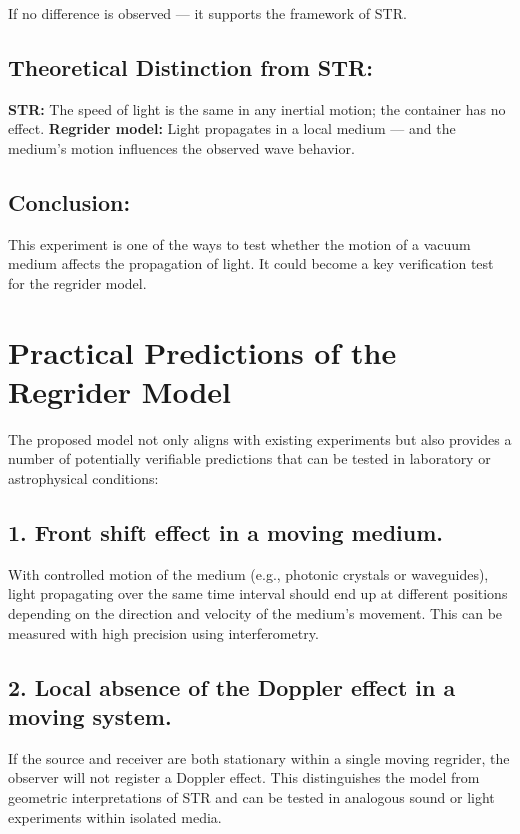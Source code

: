 \documentclass[12pt]{article}
\begin{document}
If no difference is observed — it supports the framework of STR.

\subsection*{Theoretical Distinction from STR:}
\textbf{STR:} The speed of light is the same in any inertial motion; the container has no effect.  
\textbf{Regrider model:} Light propagates in a local medium — and the medium's motion influences the observed wave behavior.

\subsection*{Conclusion:}
This experiment is one of the ways to test whether the motion of a vacuum medium affects the propagation of light.  
It could become a key verification test for the regrider model.

\section*{Practical Predictions of the Regrider Model}

The proposed model not only aligns with existing experiments but also provides a number of potentially verifiable predictions that can be tested in laboratory or astrophysical conditions:

\subsection*{1. Front shift effect in a moving medium.}
With controlled motion of the medium (e.g., photonic crystals or waveguides), light propagating over the same time interval should end up at different positions depending on the direction and velocity of the medium's movement. This can be measured with high precision using interferometry.

\subsection*{2. Local absence of the Doppler effect in a moving system.}
If the source and receiver are both stationary within a single moving regrider, the observer will not register a Doppler effect. This distinguishes the model from geometric interpretations of STR and can be tested in analogous sound or light experiments within isolated media.
\end{document}
